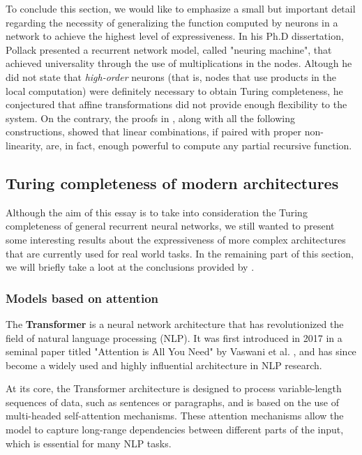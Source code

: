 \documentclass{article}
\begin{document}
To conclude this section, we would like to emphasize a small but important detail regarding the necessity of generalizing the function computed by neurons in a network to achieve the highest level of expressiveness. In his Ph.D dissertation, Pollack \cite{POL87} presented a recurrent network model, called "neuring machine", that achieved universality through the use of multiplications in the nodes. Altough he did not state that \textit{high-order} neurons (that is, nodes that use products in the local computation) were definitely necessary to obtain Turing completeness, he conjectured that affine transformations did not provide enough flexibility to the system. On the contrary, the proofs in \cite{SIE95}, along with all the following constructions, showed that linear combinations, if paired with proper non-linearity, are, in fact, enough powerful to compute any partial recursive function.

\subsection{Turing completeness of modern architectures}

Although the aim of this essay is to take into consideration the Turing completeness of general recurrent neural networks, we still wanted to present some interesting results about the expressiveness of more complex architectures that are currently used for real world tasks. In the remaining part of this section, we will briefly take a loot at the conclusions provided by \cite{PER19}.

\subsubsection{Models based on attention}
The \textbf{Transformer} is a neural network architecture that has revolutionized the field of natural language processing (NLP). It was first introduced in 2017 in a seminal paper titled "Attention is All You Need" by Vaswani et al. \cite{VAS17}, and has since become a widely used and highly influential architecture in NLP research.

At its core, the Transformer architecture is designed to process variable-length sequences of data, such as sentences or paragraphs, and is based on the use of multi-headed self-attention mechanisms. These attention mechanisms allow the model to capture long-range dependencies between different parts of the input, which is essential for many NLP tasks.
\end{document}
